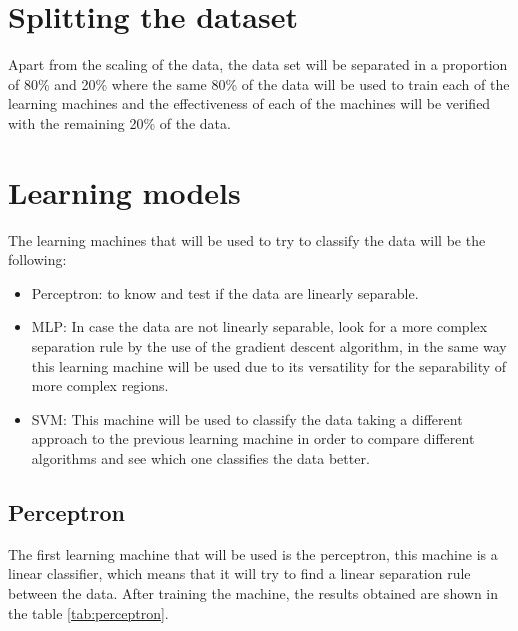 \documentclass{article}
\theoremstyle{mytheoremstyle}
\theoremstyle{mytheoremstyle}
\theoremstyle{myproblemstyle}
\begin{document}
\section*{Splitting the dataset}

Apart from the scaling of the data, the data set will be separated in a proportion of 80\% and 20\% where the same 80\% of the data will be used to train each of the learning machines and the effectiveness of each of the machines will be verified with the remaining 20\% of the data.

\section*{Learning models}

The learning machines that will be used to try to classify the data will be the following:

\begin{itemize}
  \item Perceptron: to know and test if the data are linearly separable.

  \item MLP: In case the data are not linearly separable, look for a more complex separation rule by the use of the gradient descent algorithm, in the same way this learning machine will be used due to its versatility for the separability of more complex regions.

  \item SVM: This machine will be used to classify the data taking a different approach to the previous learning machine in order to compare different algorithms and see which one classifies the data better.
\end{itemize}

\subsection*{Perceptron}

The first learning machine that will be used is the perceptron, this machine is a linear classifier, which means that it will try to find a linear separation rule between the data. After training the machine, the results obtained are shown in the table \ref{tab:perceptron}.
\end{document}
